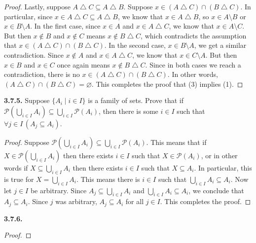 \documentclass[12pt]{amsart}
\newenvironment{statement}[1]{\smallskip\noindent\color[rgb]{.6627, .3529, .6314} {\bf #1.}}{}
\theoremstyle{definition}
\theoremstyle{remark}
\newcommand{\powerset}[1]{\mathscr{P} \left( #1 \right)}
\begin{document}
\begin{proof}
Lastly, suppose $A \bigtriangleup C \subseteq A \bigtriangleup B$.
Suppose $x \in (A \bigtriangleup C) \cap (B \bigtriangleup C)$.
In particular, since $x \in A \bigtriangleup C \subseteq A \bigtriangleup B$, we know that $x \in A \bigtriangleup B$, so $x \in A \setminus B$ or $x \in B \setminus A$.
In the first case, since $x \in A$ and $x \in A \bigtriangleup C$, we know that $x \in A \setminus C$.
But then $x \notin B$ and $x \notin C$ means $x \notin B \bigtriangleup C$, which contradicts the assumption that $x \in (A \bigtriangleup C) \cap (B \bigtriangleup C)$.
In the second case, $x \in B \setminus A$, we get a similar contradiction.
Since $x \notin A$ and $x \in A \bigtriangleup C$, we know that $x \in C \setminus A$.
But then $x \in B$ and $x \in C$ once again means $x \notin B \bigtriangleup C$.
Since in both cases we reach a contradiction, there is no $x \in (A \bigtriangleup C) \cap (B \bigtriangleup C)$.
In other words, $(A \bigtriangleup C) \cap (B \bigtriangleup C) = \varnothing$.
This completes the proof that (3) implies (1).
\end{proof}


\begin{statement}{3.7.5}
Suppose $\{ A_i \mid i \in I \}$ is a family of sets.
Prove that if $\powerset{\bigcup_{i \in I} A_i} \subseteq \bigcup_{i \in I} \powerset{A_i}$, then there is some $i \in I$ such that $\forall j \in I \, (A_j \subseteq A_i)$.
\end{statement}

\begin{proof}
Suppose $\powerset{\bigcup_{i \in I} A_i} \subseteq \bigcup_{i \in I} \powerset{A_i}$.
This means that if $X \in \powerset{\bigcup_{i \in I} A_i}$ then there exists $i \in I$ such that $X \in \powerset{A_i}$, or in other words if $X \subseteq \bigcup_{i \in I} A_i$ then there exists $i \in I$ such that $X \subseteq A_i$.
In particular, this is true for $X = \bigcup_{i \in I} A_i$.
This means there is $i \in I$ such that $\bigcup_{i \in I} A_i \subseteq A_i$.
Now let $j \in I$ be arbitrary.
Since $A_j \subseteq \bigcup_{i \in I} A_i$ and $\bigcup_{i \in I} A_i \subseteq A_i$, we conclude that $A_j \subseteq A_i$.
Since $j$ was arbitrary, $A_j \subseteq A_i$ for all $j \in I$.
This completes the proof.
\end{proof}


\begin{statement}{3.7.6}
\end{statement}

\begin{proof}
\end{proof}
\end{document}
